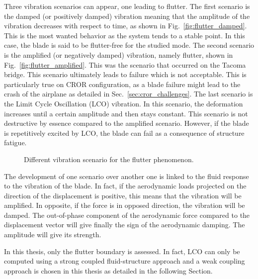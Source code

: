 Three vibration scenarios can appear, one leading to flutter.
The first scenario is the damped (or positively damped) 
vibration meaning
that the amplitude of the vibration decreases with respect to time, 
as shown in Fig.~\ref{fig:flutter_damped}.
This is the most wanted behavior as the system tends to
a stable point. In this case, the blade is said to
be flutter-free for the studied mode.
The second scenario is the amplified (or negatively damped)
vibration, namely flutter, shown in Fig.~\ref{fig:flutter_amplified}. 
This was the scenario that occurred on the Tacoma bridge. 
This scenario ultimately
leads to failure which is not acceptable. This is particularly true
on CROR configuration, as a blade failure might lead to 
the crash of the airplane as detailed in Sec.~\ref{sec:cror_challenges}.
The last scenario is the Limit Cycle Oscillation (LCO) vibration.
In this scenario, the deformation increases until a certain 
amplitude and then stays constant. This scenario is not
destructive by essence compared to the amplified scenario. However,
if the blade is repetitively excited by LCO, the blade
can fail as a consequence of structure fatigue.
\begin{figure}[htp]
  \centering
  \caption{Different vibration scenario for the flutter phenomenon.}
\end{figure}

The development of one scenario over another one is linked to
the fluid response to the vibration of the blade. In fact,
if the aerodynamic loads projected on the direction of the displacement
is positive, this means that the vibration will be amplified. 
In opposite, if the force is in opposed direction, the vibration will be damped.
The out-of-phase component of the aerodynamic force compared to
the displacement vector will give finally the sign of the aerodynamic damping.
The amplitude will give its strength. 

In this thesis, only the flutter boundary is assessed. In fact,
LCO can only be computed using a strong coupled fluid-structure 
approach and a weak coupling approach is chosen in this thesis
as detailed in the following Section.
